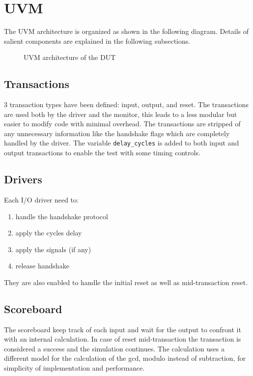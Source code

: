 \section{UVM}
The UVM architecture is organized as shown in the following diagram.
Details of salient components are explained in the following subsections.
\begin{figure}[h]
  \centering
  
  \caption{UVM architecture of the DUT}
\end{figure}

\subsection*{Transactions}
3 transaction types have been defined: input, output, and reset.
The transactions are used both by the driver and the monitor, this leads to a less modular but easier to modify code with minimal overhead.
The transactions are stripped of any unnecessary information like the handshake flags which are completely handled by the driver.
The variable \texttt{delay\_cycles} is added to both input and output transactions to enable the test with some timing controls.

\newpage
\subsection*{Drivers}
Each I/O driver need to:
\begin{enumerate}
    \item handle the handshake protocol
    \item apply the cycles delay
    \item apply the signals (if any)
    \item release handshake
\end{enumerate}
They are also enabled to handle the initial reset as well as mid-transaction reset.

\subsection*{Scoreboard}
The scoreboard keep track of each input and wait for the output to confront it with an internal calculation.
In case of reset mid-transaction the transaction is considered a success and the simulation continues.
The calculation uses a different model for the calculation of the gcd, modulo instead of subtraction, for simplicity of implementation and performance.


